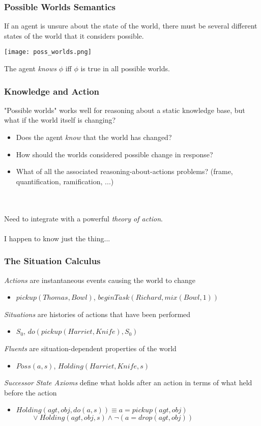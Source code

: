 \documentclass{beamer}
\begin{document}
\begin{frame}
\frametitle{Possible Worlds Semantics}

If an agent is unsure about the state of the world, there must be several
different states of the world that it considers possible.

\begin{center}
  \texttt{[image: poss\_worlds.png]}
\end{center}

The agent \emph{knows} $\phi$ iff $\phi$ is true in all possible worlds.

\end{frame}

\begin{frame}
\frametitle{Knowledge and Action}
"Possible worlds" works well for reasoning about a static knowledge base,
but what if the world itself is changing?
\begin{itemize}
\item  Does the agent \emph{know} that the world has changed?
\item  How should the worlds considered possible change in response?
\item  What of all the associated reasoning-about-actions problems? (frame, quantification, ramification, ...)
\end{itemize}
\ \\
\ \\
Need to integrate with a powerful \emph{theory of action}.
\pause
\ \\
\ \\
I happen to know just the thing...
\end{frame}

\begin{frame}
\frametitle{The Situation Calculus}
\emph{Actions} are instantaneous events causing the world to change
\begin{itemize}
  \item $pickup(Thomas,Bowl)$, $beginTask(Richard,mix(Bowl,1))$
\end{itemize}
\emph{Situations} are histories of actions that have been performed
\begin{itemize}
  \item $S_0$, $do(pickup(Harriet,Knife),S_0)$
\end{itemize}
\emph{Fluents} are situation-dependent properties of the world
\begin{itemize}
  \item $Poss(a,s)$, $Holding(Harriet,Knife,s)$
\end{itemize}
\emph{Successor State Axioms} define what holds after an action in terms of what held before the action
\begin{itemize}
  \item $Holding(agt,obj,do(a,s)) \equiv a = pickup(agt,obj)$ \\
        $\,\,\,\,\,\,\,\,\,\,\,\,\,\vee Holding(agt,obj,s) \wedge \neg\left(a = drop(agt,obj)\right)$
\end{itemize}
\end{frame}
\end{document}
